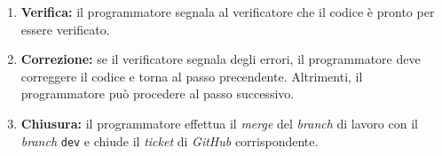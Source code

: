 \begin{itemize}
\begin{enumerate}
		      \item \textbf{Verifica:} il programmatore segnala al
		            verificatore che il codice è pronto per essere verificato.

		      \item \textbf{Correzione:} se il verificatore segnala degli
		            errori, il programmatore deve correggere il codice e torna
		            al passo precendente. Altrimenti, il programmatore può
		            procedere al passo successivo.

		      \item \textbf{Chiusura:} il programmatore effettua il
		            \textit{merge} del \textit{branch} di lavoro con il
		            \textit{branch} \texttt{dev} e chiude il \textit{ticket} di
		            \textit{GitHub\g} corrispondente.
	      \end{enumerate}
\end{itemize}

